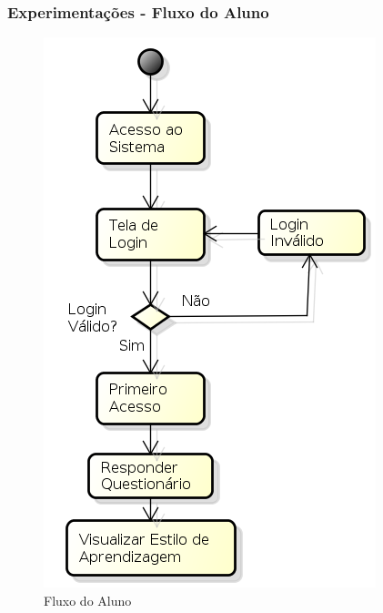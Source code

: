 \documentclass{beamer}
\begin{document}
\begin{frame}
    \frametitle{Experimentações - Fluxo do Aluno}
    \begin{figure}[h]
    	\centering \includegraphics[scale=0.3]{../images/fluxo-aluno.png}
	\caption{Fluxo do Aluno}
	\label{arquiteturaFrank} 
    \end{figure}
\end{frame}
\end{document}
